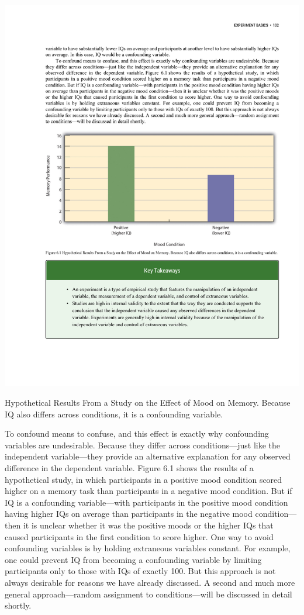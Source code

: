 \begin{marginfigure}[0in]
\includegraphics[width=\linewidth]{figures/C6confound.pdf}
\caption{Hypothetical Results From a Study on the Effect of Mood on Memory. Because IQ also differs across conditions, it is a confounding variable.}
\label{fig:confound}
\end{marginfigure}

To confound means to confuse, and this effect is exactly why confounding variables are undesirable. Because they differ across conditions---just like the independent variable---they provide an alternative explanation for any observed difference in the dependent variable. Figure 6.1 shows the results of a hypothetical study, in which participants in a positive mood condition scored higher on a memory task than participants in a negative mood condition. But if IQ is a confounding variable---with participants in the positive mood condition having higher IQs on average than participants in the negative mood condition---then it is unclear whether it was the positive moods or the higher IQs that caused participants in the first condition to score higher. One way to avoid confounding variables is by holding extraneous variables constant. For example, one could prevent IQ from becoming a confounding variable by limiting participants only to those with IQs of exactly 100. But this approach is not always desirable for reasons we have already discussed. A second and much more general approach---random assignment to conditions---will be discussed in detail shortly.

